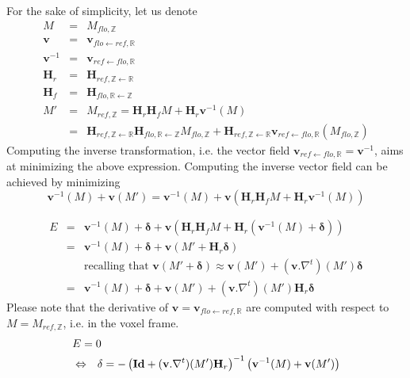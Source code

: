 For the sake of simplicity, let us denote 
\begin{eqnarray*}
M & = & M_{flo,\mathbb{Z}} \\
\mathbf{v} & = & \mathbf{v}_{flo \leftarrow ref, \mathbb{R}} \\
\mathbf{v}^{-1} & = & \mathbf{v}_{ref \leftarrow flo, \mathbb{R}} \\
\mathbf{H}_r & = & \mathbf{H}_{ref,\mathbb{Z} \leftarrow \mathbb{R}} \\
\mathbf{H}_f & = & \mathbf{H}_{flo,\mathbb{R} \leftarrow \mathbb{Z}}  \\
M' & = & M_{ref,\mathbb{Z}} =
\mathbf{H}_r \mathbf{H}_f M + \mathbf{H}_r \mathbf{v}^{-1}(M) \\
& = & \mathbf{H}_{ref,\mathbb{Z} \leftarrow \mathbb{R}} 
\mathbf{H}_{flo,\mathbb{R} \leftarrow \mathbb{Z}} 
M_{flo,\mathbb{Z}}
+ 
\mathbf{H}_{ref,\mathbb{Z} \leftarrow \mathbb{R}}
\mathbf{v}_{ref \leftarrow flo, \mathbb{R}}(M_{flo,\mathbb{Z}} )
\end{eqnarray*}
Computing the inverse transformation, i.e. the vector field $\mathbf{v}_{ref \leftarrow flo, \mathbb{R}} = \mathbf{v}^{-1}$, aims at minimizing the above expression. 
Computing the inverse vector field can be achieved by minimizing
\begin{equation}
\mathbf{v}^{-1}(M) + \mathbf{v}( M' )
= \mathbf{v}^{-1}(M) + \mathbf{v}( \mathbf{H}_r \mathbf{H}_f M + \mathbf{H}_r \mathbf{v}^{-1}(M)  )
\label{eq:inverse:vector:r}
\end{equation} 

\begin{eqnarray*}
E & = &
\mathbf{v}^{-1}(M) + \mathbf{\delta} 
+ \mathbf{v}( \mathbf{H}_r \mathbf{H}_f M + \mathbf{H}_r (\mathbf{v}^{-1}(M) + \mathbf{\delta} ))
\\
& = &
\mathbf{v}^{-1}(M) + \mathbf{\delta} 
+ \mathbf{v}( M' + \mathbf{H}_r  \mathbf{\delta} )
\\
& & \mbox{recalling that }
\mathbf{v}(M' + \mathbf{\delta}) \approx 
\mathbf{v}( M' ) + (\mathbf{v}.\nabla^t)(M') \mathbf{\delta}
\\
& = &
\mathbf{v}^{-1}(M) + \mathbf{\delta} +
\mathbf{v}( M' ) 
+ (\mathbf{v}.\nabla^t)( M' ) \mathbf{H}_r \mathbf{\delta} 
\end{eqnarray*}
Please note that the derivative of 
$\mathbf{v} = \mathbf{v}_{flo \leftarrow ref, \mathbb{R}}$ are computed with respect to $M = M_{ref,\mathbb{Z}}$, i.e. in the voxel frame.
\begin{eqnarray*}
\lefteqn{ E = 0 } \\
& \Leftrightarrow &
\mathbf{\delta}  =
- \left(
\mathbf{Id} + (\mathbf{v}.\nabla^t)( M' ) \mathbf{H}_r
\right)^{-1}
\left( \mathbf{v}^{-1}(M) + \mathbf{v}( M' )
\right)
\end{eqnarray*}


